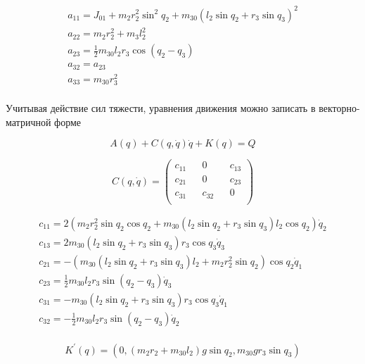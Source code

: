   \begin{equation*}
  \begin{array}{l}
  a_{11} = J_{01} + m_2 r_2^2 \sin^2 q_2 + m_{30} (l_2 \sin q_2 + r_3 \sin q_3)^2 \\
  a_{22} = m_2 r_2^2 + m_3 l_2^2 \\
  a_{23} = \frac12 m_{30} l_2 r_3 \cos(q_2 - q_3) \\
  a_{32} = a_{23} \\
  a_{33} = m_{30} r_3^2 \\
  \end{array}
  \end{equation*}
  
  Учитывая действие сил тяжести, уравнения движения можно записать в векторно-матричной форме
    
  \begin{equation}
  A(q) + C(q, \dot q) \dot q + K(q) = Q \label{chain3_matrix_form}
  \end{equation}
    
  \begin{equation*}
  C(q, \dot q)= 
  \begin{pmatrix}
  c_{11} && 0 && c_{13} \\
  c_{21} && 0 && c_{23} \\
  c_{31} && c_{32} && 0\\
  \end{pmatrix}
  \end{equation*} 
        
   \begin{equation*}
   \begin{array}{l}
   c_{11} = 2 (m_2 r_2^2 \sin q_2 \cos q_2 + m_{30} (l_2 \sin q_2 + r_3 \sin q_3) l_2 \cos q_2) \dot q_2 \\
   c_{13} = 2 m_{30} (l_2 \sin q_2 + r_3 \sin q_3) r_3 \cos q_3 \dot q_3 \\
   c_{21} = - (m_{30} (l_2 \sin q_2 + r_3 \sin q_3) l_2 + m_2 r_2^2 \sin q_2) \cos q_2 \dot q_1 \\
   c_{23} = \frac12 m_{30} l_2 r_3 \sin(q_2 - q_3) \dot q_3 \\
   c_{31} = - m_{30} (l_2 \sin q_2 + r_3 \sin q_3) r_3 \cos q_3 \dot q_1 \\
   c_{32} = - \frac12 m_{30} l_2 r_3 \sin (q_2 - q_3) \dot q_2 \\
   \end{array}
   \end{equation*}
 
 
   \begin{equation*}
   K^{'} (q) = (0, (m_2 r_2 + m_{30} l_2) g \sin q_2, m_{30} g r_3 \sin q_3)
   \end{equation*}
 
